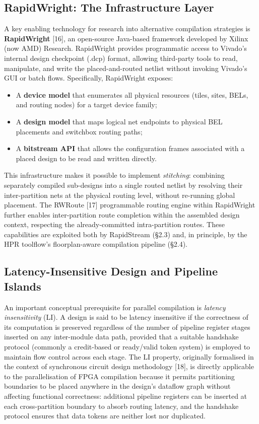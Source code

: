 \subsection{RapidWright: The Infrastructure Layer}

A key enabling technology for research into alternative compilation strategies is \textbf{RapidWright} [16], an open-source Java-based framework developed by Xilinx (now AMD) Research. RapidWright provides programmatic access to Vivado's internal design checkpoint (.dcp) format, allowing third-party tools to read, manipulate, and write the placed-and-routed netlist without invoking Vivado's GUI or batch flows. Specifically, RapidWright exposes:

\begin{itemize}
  \item A \textbf{device model} that enumerates all physical resources (tiles, sites, BELs, and routing nodes) for a target device family;
  \item A \textbf{design model} that maps logical net endpoints to physical BEL placements and switchbox routing paths;
  \item A \textbf{bitstream API} that allows the configuration frames associated with a placed design to be read and written directly.
\end{itemize}
This infrastructure makes it possible to implement \textit{stitching}: combining separately compiled sub-designs into a single routed netlist by resolving their inter-partition nets at the physical routing level, without re-running global placement. The RWRoute [17] programmable routing engine within RapidWright further enables inter-partition route completion within the assembled design context, respecting the already-committed intra-partition routes. These capabilities are exploited both by RapidStream (§2.3) and, in principle, by the HPR toolflow's floorplan-aware compilation pipeline (§2.4).

\subsection{Latency-Insensitive Design and Pipeline Islands}

An important conceptual prerequisite for parallel compilation is \textit{latency insensitivity} (LI). A design is said to be latency insensitive if the correctness of its computation is preserved regardless of the number of pipeline register stages inserted on any inter-module data path, provided that a suitable handshake protocol (commonly a credit-based or ready/valid token system) is employed to maintain flow control across each stage. The LI property, originally formalised in the context of synchronous circuit design methodology [18], is directly applicable to the parallelisation of FPGA compilation because it permits partitioning boundaries to be placed anywhere in the design's dataflow graph without affecting functional correctness: additional pipeline registers can be inserted at each cross-partition boundary to absorb routing latency, and the handshake protocol ensures that data tokens are neither lost nor duplicated.

